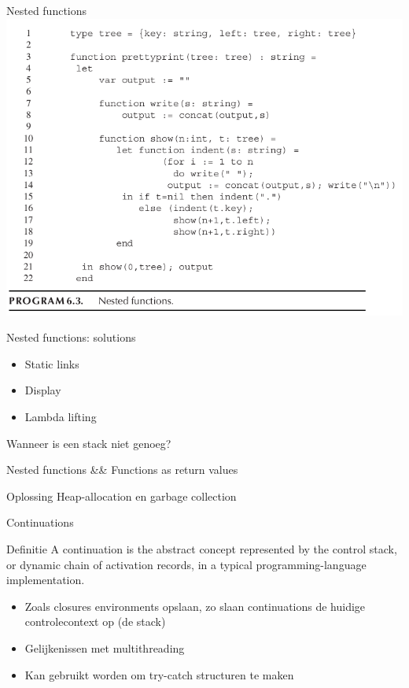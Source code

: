 \documentclass{beamer}
\begin{document}
\begin{frame}{Nested functions}
    \includegraphics[width=\textwidth]{nested_functions.png}
\end{frame}

\begin{frame}{Nested functions: solutions}
    \begin{itemize}
        \item Static links
        \item Display
        \item Lambda lifting
    \end{itemize}
\end{frame}

\begin{frame}{Wanneer is een stack niet genoeg?}
\begin{block}{}
    Nested functions \&\& Functions as return values
\end{block}
\begin{block}{Oplossing}
    Heap-allocation en garbage collection
\end{block}
\end{frame}

\begin{frame}{Continuations}
\begin{block}{Definitie}
    A continuation is the abstract concept represented by the control stack, or dynamic chain of activation records, in a typical programming-language implementation.
\end{block}
\begin{itemize}
    \item Zoals closures environments opslaan, zo slaan continuations de huidige controlecontext op (de stack)
    \item Gelijkenissen met multithreading
    \item Kan gebruikt worden om try-catch structuren te maken
\end{itemize}
\end{frame}
\end{document}
